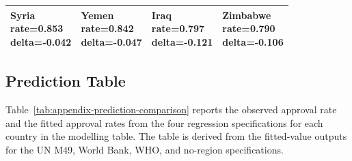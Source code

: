\documentclass[runningheads]{llncs}
\begin{document}
{\begin{longtable}{p{}p{}p{}p{}}
\hline
\shortstack[l]{Syria\\ rate=0.853\\ delta=-0.042} &\shortstack[l]{Yemen\\ rate=0.842\\ delta=-0.047} &\shortstack[l]{Iraq\\ rate=0.797\\ delta=-0.121} &\shortstack[l]{Zimbabwe\\ rate=0.790\\ delta=-0.106} \\
\hline
\end{longtable}
}

\subsection{Prediction Table}

Table~\ref{tab:appendix-prediction-comparison} reports the observed approval rate and the fitted approval rates from the four regression specifications for each country in the modelling table. The table is derived from the fitted-value outputs for the UN M49, World Bank, WHO, and no-region specifications.
\end{document}
